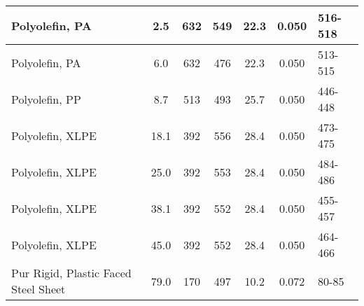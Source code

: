 \begin{table}[!h]
\begin{tabular}{|l|c|c|c|c|c|p{3.7cm}|}
Polyolefin, PA                                    & 2.5  & 632  & 549 & 22.3 & 0.050 & 516-518 \\\hline
Polyolefin, PA                                    & 6.0  & 632  & 476 & 22.3 & 0.050 & 513-515 \\\hline
Polyolefin, PP                                    & 8.7  & 513  & 493 & 25.7 & 0.050 & 446-448 \\\hline
Polyolefin, XLPE                                  & 18.1 & 392 & 556 & 28.4 & 0.050 & 473-475 \\\hline
Polyolefin, XLPE                                  & 25.0 & 392 & 553 & 28.4 & 0.050 & 484-486 \\\hline
Polyolefin, XLPE                                  & 38.1 & 392 & 552 & 28.4 & 0.050 & 455-457 \\\hline
Polyolefin, XLPE                                  & 45.0 & 392 & 552 & 28.4 & 0.050 & 464-466 \\\hline
Pur Rigid, Plastic Faced Steel Sheet              & 79.0 & 170 & 497 & 10.2 & 0.072 & 80-85 \\\hline
\end{tabular}
\label{Properties_RISE_Materials_Mixtures1}
\end{table}
\vspace{-0.4cm}
\\
\\
\\

\clearpage


